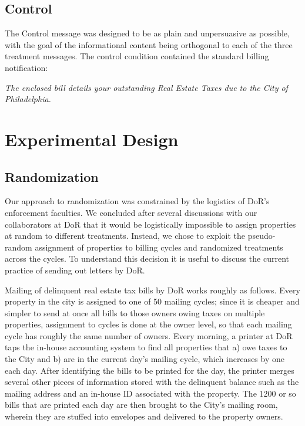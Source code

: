 \documentclass[12pt,titlepage]{article}
\begin{document}
\subsection{Control}

The Control message was designed to be as plain and unpersuasive as possible, 
with the goal of the informational content being orthogonal to each of the
three treatment messages.  The control condition contained the standard billing
notification: 

{\it The enclosed bill details your outstanding 
Real Estate Taxes due to the City of Philadelphia.}

\section{Experimental Design}

\subsection{Randomization}

Our approach to randomization was constrained by the logistics of
DoR's enforcement faculties. We concluded after several discussions with 
our collaborators at DoR that it would be logistically impossible to assign properties 
at random to different treatments. Instead, we chose to exploit the
pseudo-random assignment of properties to billing cycles and randomized
treatments across the cycles.  To understand this decision it is
useful to discuss the current practice of sending out letters by DoR.

Mailing of delinquent real estate tax bills by DoR works roughly as
follows.  Every property in the city is assigned to one of 50 mailing
cycles; since it is cheaper and simpler to send at once all bills to
those owners owing taxes on multiple properties, assignment to cycles
is done at the owner level, so that each mailing cycle has roughly the
same number of owners.  Every morning, a printer at DoR taps the
in-house accounting system to find all properties that a) owe taxes to
the City and b) are in the current day's mailing cycle, which
increases by one each day. After identifying the bills to be
printed for the day, the printer merges several other pieces of
information stored with the delinquent balance such as the mailing
address and an in-house ID associated with the property. The 1200 or
so bills that are printed each day are then brought to the City's
mailing room, wherein they are stuffed into envelopes and delivered to
the property owners.
\end{document}
